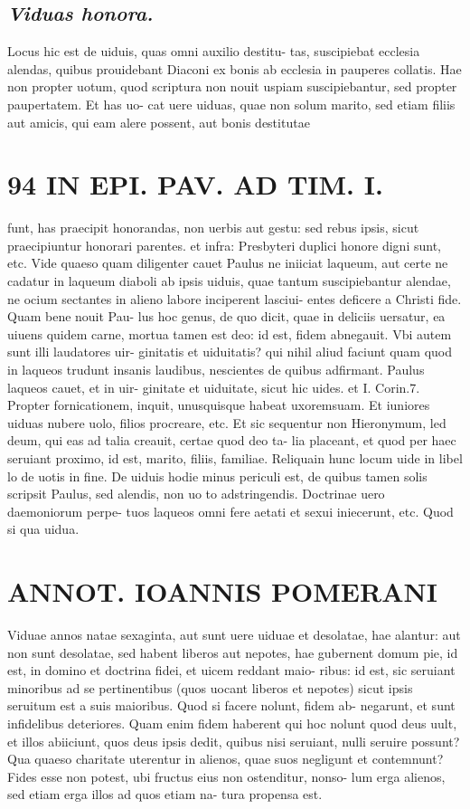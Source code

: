 \documentclass{article}
\begin{document}
\begin{pages}
\subsection*{\textit{Viduas honora. }}\pstart Locus hic est de uiduis, quas omni auxilio destitu- tas, suscipiebat ecclesia alendas, quibus prouidebant Diaconi ex bonis ab ecclesia in pauperes collatis. Hae non propter uotum, quod scriptura non nouit uspiam suscipiebantur, sed propter paupertatem. Et has uo- cat uere uiduas, quae non solum marito, sed etiam filiis aut amicis, qui eam alere possent, aut bonis destitutae  \pend
\section*{94 IN EPI. PAV. AD TIM. I. }
\marginpar{[ p.94 ]}\pstart funt, has praecipit honorandas, non uerbis aut gestu: sed rebus ipsis, sicut praecipiuntur honorari parentes. et infra: Presbyteri duplici honore digni sunt, etc. Vide quaeso quam diligenter cauet Paulus ne iniiciat laqueum, aut certe ne cadatur in laqueum diaboli ab ipsis uiduis, quae tantum suscipiebantur alendae, ne ocium sectantes in alieno labore inciperent lasciui- entes deficere a Christi fide. Quam bene nouit Pau- lus hoc genus, de quo dicit, quae in deliciis uersatur, ea uiuens quidem carne, mortua tamen est deo: id est, fidem abnegauit. Vbi autem sunt illi laudatores uir- ginitatis et uiduitatis? qui nihil aliud faciunt quam quod in laqueos trudunt insanis laudibus, nescientes de quibus adfirmant. Paulus laqueos cauet, et in uir- ginitate et uiduitate, sicut hic uides. et I. Corin.7. Propter fornicationem, inquit, unusquisque habeat uxoremsuam. Et iuniores uiduas nubere uolo, filios procreare, etc. Et sic sequentur non Hieronymum, led deum, qui eas ad talia creauit, certae quod deo ta- lia placeant, et quod per haec seruiant proximo, id est, marito, filiis, familiae. Reliquain hunc locum uide in libel lo de uotis in fine. De uiduis hodie minus periculi est, de quibus tamen solis scripsit Paulus, sed alendis, non uo to adstringendis. Doctrinae uero daemoniorum perpe- tuos laqueos omni fere aetati et sexui iniecerunt, etc.  \pend\pstart Quod si qua uidua.  \pend
\section*{ANNOT. IOANNIS POMERANI }\pstart Viduae annos natae sexaginta, aut sunt uere uiduae et desolatae, hae alantur: aut non sunt desolatae, sed habent liberos aut nepotes, hae gubernent domum pie, id est, in domino et doctrina fidei, et uicem reddant maio- ribus: id est, sic seruiant minoribus ad se pertinentibus (quos uocant liberos et nepotes) sicut ipsis seruitum est a suis maioribus. Quod si facere nolunt, fidem ab- negarunt, et sunt infidelibus deteriores. Quam enim fidem haberent qui hoc nolunt quod deus uult, et illos abiiciunt, quos deus ipsis dedit, quibus nisi seruiant, nulli seruire possunt? Qua quaeso charitate uterentur in alienos, quae suos negligunt et contemnunt? Fides esse non potest, ubi fructus eius non ostenditur, nonso- lum erga alienos, sed etiam erga illos ad quos etiam na- tura propensa est.  \pend
{}
{}

\end{pages}
\end{document}
